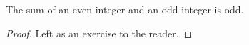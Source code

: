 \guard




\begin{prop}
\label{prop:sumOfEvenAndOddIsOdd}
  The sum of an even integer and an odd integer is odd.
\end{prop}
\begin{proof}
  Left as an exercise to the reader.
\end{proof}
